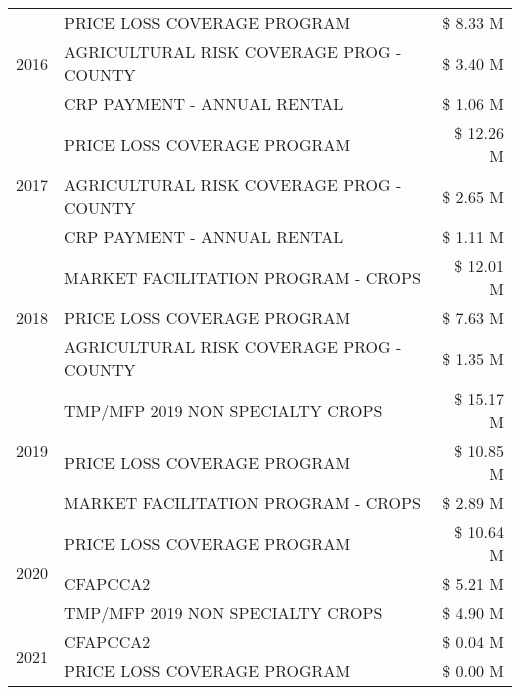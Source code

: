 \begin{tabular}{llr}
\cline{1-3}
\multirow[t]{3}{*}{2016} & PRICE LOSS COVERAGE PROGRAM                   & \$ 8.33 M \\
 & AGRICULTURAL RISK COVERAGE PROG - COUNTY      & \$ 3.40 M \\
 & CRP PAYMENT - ANNUAL RENTAL                   & \$ 1.06 M \\
\cline{1-3}
\multirow[t]{3}{*}{2017} & PRICE LOSS COVERAGE PROGRAM & \$ 12.26 M \\
 & AGRICULTURAL RISK COVERAGE PROG - COUNTY & \$ 2.65 M \\
 & CRP PAYMENT - ANNUAL RENTAL & \$ 1.11 M \\
\cline{1-3}
\multirow[t]{3}{*}{2018} & MARKET FACILITATION PROGRAM - CROPS & \$ 12.01 M \\
 & PRICE LOSS COVERAGE PROGRAM & \$ 7.63 M \\
 & AGRICULTURAL RISK COVERAGE PROG - COUNTY & \$ 1.35 M \\
\cline{1-3}
\multirow[t]{3}{*}{2019} & TMP/MFP 2019 NON SPECIALTY CROPS & \$ 15.17 M \\
 & PRICE LOSS COVERAGE PROGRAM & \$ 10.85 M \\
 & MARKET FACILITATION PROGRAM - CROPS & \$ 2.89 M \\
\cline{1-3}
\multirow[t]{3}{*}{2020} & PRICE LOSS COVERAGE PROGRAM & \$ 10.64 M \\
 & CFAPCCA2 & \$ 5.21 M \\
 & TMP/MFP 2019 NON SPECIALTY CROPS & \$ 4.90 M \\
\cline{1-3}
\multirow[t]{2}{*}{2021} & CFAPCCA2 & \$ 0.04 M \\
 & PRICE LOSS COVERAGE PROGRAM & \$ 0.00 M \\
\cline{1-3}
\bottomrule
\end{tabular}
